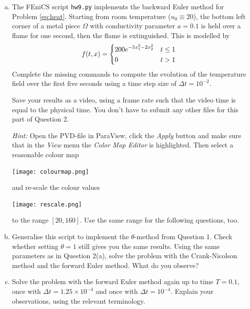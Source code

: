 \documentclass[10pt,letterpaper]{scrartcl}
\begin{document}
\begin{enumerate}[(a)]
\item \faFileMovieO \: The \textsf{FEniCS} script \texttt{hw9.py} implements the backward Euler method for Problem \eqref{eq:heat}. Starting from room temperature ($u_0 \equiv 20$), the bottom left corner of a metal piece $\Omega$ with conductivity parameter $a=0.1$ is held over a flame for one second, then the flame is extinguished. This is modelled by
\begin{equation*}
f(t,x) =
\begin{dcases}
200e^{-5x_1^2 - 2x_2^2} & t \leq 1\\
0 & t > 1
\end{dcases}
\end{equation*}
Complete the missing commands to compute the evolution of the temperature field over the first five seconds using a time step size of $\Delta t = 10^{-2}$.

Save your results as a video, using a frame rate such that the video time is equal to the physical time. You don't have to submit any other files for this part of Question 2.

\emph{Hint:} Open the PVD-file in \textsf{ParaView}, click the \emph{Apply} button and make sure that in the \emph{View} menu the \emph{Color Map Editor} is highlighted. Then select a reasonable colour map
\begin{center}
\texttt{[image: colourmap.png]}
\end{center}
and re-scale the colour values
\begin{center}
\texttt{[image: rescale.png]}
\end{center}
to the range $[20,160]$. Use the same range for the following questions, too.
\item \faFileCodeO \: Generalise this script to implement the $\theta$-method from Question 1. Check whether setting $\theta = 1$ still gives you the same results. Using the same parameters as in Question 2(a), solve the problem with the Crank-Nicolson method and the forward Euler method. What do you observe?

\vfill

\item \faFilePdfO \: Solve the problem with the forward Euler method again up to time $T=0.1$, once with $\Delta t = 1.25 \times 10^{-4}$ and once with $\Delta t = 10^{-4}$. Explain your observations, using the relevant terminology.

\vfill

\end{enumerate}
\end{document}
